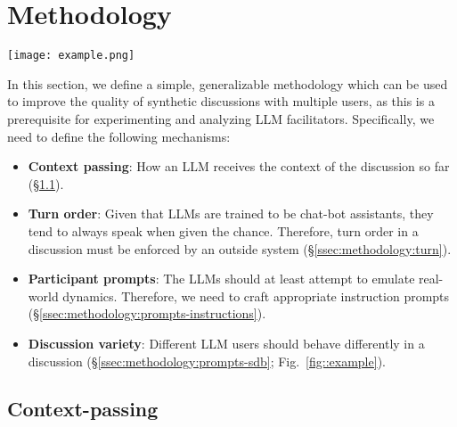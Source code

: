 %

\section{Methodology}
\label{sec:methodology}

 \begin{figure*}[t]
	\centering
	\texttt{[image: example.png]}
	\caption{Excerpt from a synthetic discussion. The LLM participants use their sociodemographic prompts to insert personal stories and justify their perspectives in the discussion. They are also able to learn and retain information about other agents through conversation (a behavior also observed in \citet{park2023game}). User \texttt{CynicalInvestor88} is also a part of the discussion; not a hallucination. Comments clipped due to length.}
	\label{fig::example}
\end{figure*}

In this section, we define a simple, generalizable methodology which can be used to improve the quality of synthetic discussions with multiple users, as this is a prerequisite for experimenting and analyzing LLM facilitators. Specifically, we need to define the following mechanisms:

\begin{itemize}[nosep, noitemsep]
	\item \textbf{Context passing}: How an LLM receives the context of the discussion so far (\S\ref{ssec:methodology:context}).  
	
	\item \textbf{Turn order}: Given that LLMs are trained to be chat-bot assistants, they tend to always speak when given the chance. Therefore, turn order in a discussion must be enforced by an outside system (\S\ref{ssec:methodology:turn}).
	
	\item \textbf{Participant prompts}: The LLMs should at least attempt to emulate real-world dynamics. Therefore, we need to craft appropriate instruction prompts (\S\ref{ssec:methodology:prompts-instructions}).
	
	\item \textbf{Discussion variety}: Different LLM users should behave differently in a discussion (\S\ref{ssec:methodology:prompts-sdb}; Fig.~\ref{fig::example}).
\end{itemize}

\subsection{Context-passing}
\label{ssec:methodology:context}

